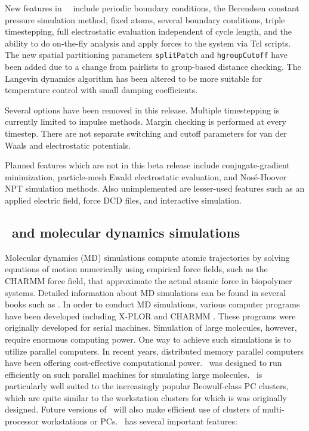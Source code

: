 New features in \NAMD\ \NAMDVER\ include periodic boundary conditions, the Berendsen constant pressure simulation method, fixed atoms, several boundary conditions, triple timestepping, full electrostatic evaluation independent of cycle length, and the ability to do on-the-fly analysis and apply forces to the system via Tcl scripts.
The new spatial partitioning parameters \verb!splitPatch! and \verb!hgroupCutoff! have been added due to a change from pairlists to group-based distance checking.
The Langevin dynamics algorithm has been altered to be more suitable for temperature control with small damping coefficients.

Several options have been removed in this release.
Multiple timestepping is currently limited to impulse methods.
Margin checking is performed at every timestep.
There are not separate switching and cutoff parameters for van der Waals and electrostatic potentials.

Planned features which are not in this beta release include conjugate-gradient minimization, particle-mesh Ewald electrostatic evaluation, and Nos{\'e}-Hoover NPT simulation methods.
Also unimplemented are lesser-used features such as an applied electric field, force DCD files, and interactive simulation.

\subsection{\NAMD\ and molecular dynamics simulations}

Molecular dynamics (MD) simulations compute atomic trajectories by solving
equations of motion numerically using empirical force fields, such as the 
CHARMM force field, that approximate the actual atomic force in 
biopolymer systems. Detailed information about MD simulations can be found in
several books such as 
. 
In order to conduct MD simulations, various computer programs have been 
developed including
X-PLOR  and 
CHARMM .
These programs were originally developed for serial machines. 
Simulation of large molecules, however, require enormous computing power. 
One way to achieve such simulations is to utilize parallel computers. In recent 
years, distributed memory parallel computers have been offering
cost-effective computational power.  \NAMD\ was designed to run efficiently
on such parallel 
machines for simulating large molecules. 
\NAMD\ is particularly well suited to the increasingly popular Beowulf-class PC clusters, which are quite similar to the workstation clusters for which is was originally designed.
Future versions of \NAMD\ will also make efficient use of clusters of multi-processor workstations or PCs.
\prettypar
\NAMD\ has several important features: 

